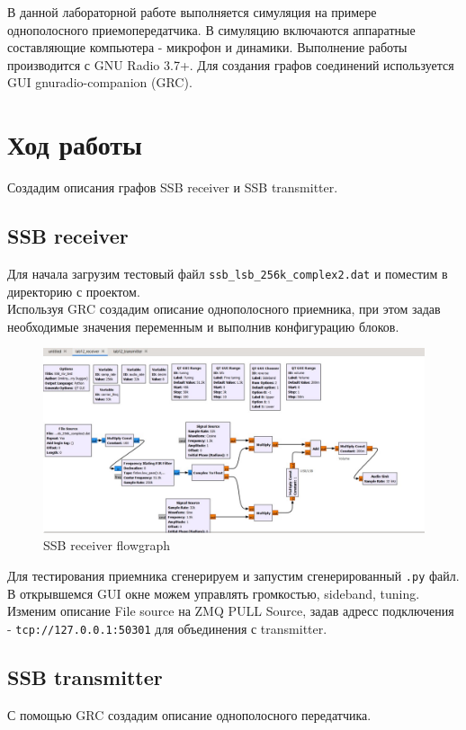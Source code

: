 \documentclass{article}
\begin{document}
В данной лабораторной работе выполняется симуляция на примере однополосного приемопередатчика. В симуляцию включаются аппаратные составляющие компьютера - микрофон и динамики. Выполнение работы производится с GNU Radio 3.7+. Для создания графов соединений используется GUI gnuradio-companion (GRC).

\newpage
\section{Ход работы}
Создадим описания графов SSB receiver и SSB transmitter.

\subsection{SSB receiver}
Для начала загрузим тестовый файл \verb|ssb_lsb_256k_complex2.dat| и поместим в директорию с проектом.\\
Используя GRC создадим описание однополосного приемника, при этом задав необходимые значения переменным и выполнив конфигурацию блоков.

\vspace{1cm}
\begin{figure}[H]
\centering
\includegraphics[width=\textwidth]{ssb_receiver_flowgraph.jpg}
\caption{SSB receiver flowgraph}
\end{figure}

Для тестирования приемника сгенерируем и запустим сгенерированный \texttt{.py} файл.\\
В открывшемся GUI окне можем управлять громкостью, sideband, tuning.
\\Изменим описание File source на ZMQ PULL Source, задав адресс подключения - \verb|tcp://127.0.0.1:50301| для объединения с transmitter.

\subsection{SSB transmitter}
С помощью GRC создадим описание однополосного передатчика.
\vspace{1cm}
\end{document}
